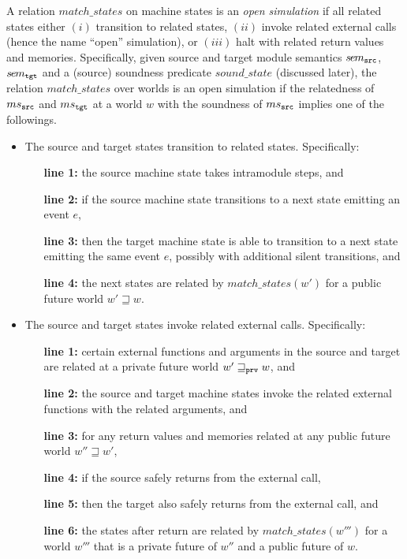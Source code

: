 A relation $match\_states$ on machine states is an \emph{open simulation} if all related states
either $(i)$ transition to related states, $(ii)$ invoke related external calls (hence the name
``open'' simulation), or $(iii)$ halt with related return values and memories.  Specifically, given
source and target module semantics $s\hspace{-0.25mm}e\hspace{-0.25mm}m_{\texttt{src}}$, $s\hspace{-0.25mm}e\hspace{-0.25mm}m_{\texttt{tgt}}$ and a (source) soundness predicate $sound\_state$ (discussed later),
the relation $match\_states$ over worlds is an open simulation if
the relatedness of $ms{}_{\texttt{src}{}}$ and $ms{}_{\texttt{tgt}{}}$ at a world $w$ with the soundness of $ms{}_{\texttt{src}{}}$ implies
one of the followings.
\begin{itemize}
\item {} The source and target states transition to related states.
  Specifically:
  \begin{itemize}[leftmargin=11mm]
  \item[\textbf{line 1:}] the source machine state takes intramodule steps, and
  \item[\textbf{line 2:}] if the source machine state transitions to a next state emitting an event $e$,
  \item[\textbf{line 3:}] then the target machine state is able to transition to a next state emitting the same
    event $e$, possibly with additional silent transitions, and
  \item[\textbf{line 4:}] the next states are related by $match\_states(w')$ for a public future world $w' \sqsupseteq w$.
  \end{itemize}
  \vskip 1mm
\item {} The source and target states invoke related external calls.
  Specifically:
  \begin{itemize}[leftmargin=11mm]
  \item[\textbf{line 1:}] certain external functions and arguments in the source and target are related at a private future world $w' \sqsupseteq_{\texttt{prv}} w$, and
  \item[\textbf{line 2:}] the source and target machine states invoke the related external functions with the related arguments, and
  \item[\textbf{line 3:}] for any return values and memories related at any public future world $w'' \sqsupseteq w'$,
  \item[\textbf{line 4:}] if the source safely returns from the external call,
  \item[\textbf{line 5:}] then the target also safely returns from the external call, and
  \item[\textbf{line 6:}] the states after return are related by $match\_states(w''')$ for a world $w'''$ that is a private future of $w''$ and a public future of $w$.


\end{itemize}
\end{itemize}
